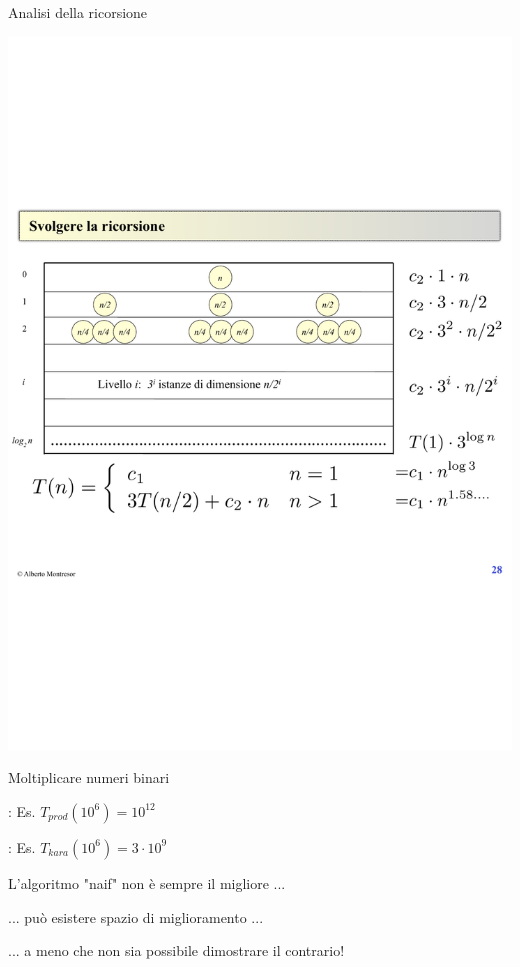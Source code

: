 \begin{frame}{Analisi della ricorsione}

\includegraphics[width=\textwidth]{karatsuba.pdf}

\end{frame}


\begin{frame}{Moltiplicare numeri binari}
\begin{myboxtitle}
\BIL
\item {}:  Es. $T_{prod}(10^6) = 10^{12}$
\item {}:  Es. $T_{kara}(10^6) = 3 \cdot 10^9$
\EIL
\end{myboxtitle}

\begin{myboxtitle}[Conclusioni]
\BIL
\item L'algoritmo "naif" non è sempre il migliore ...
\item ... può esistere spazio di miglioramento ...
\item ... a meno che non sia possibile dimostrare il contrario!
\EIL
\end{myboxtitle}

\end{frame}

